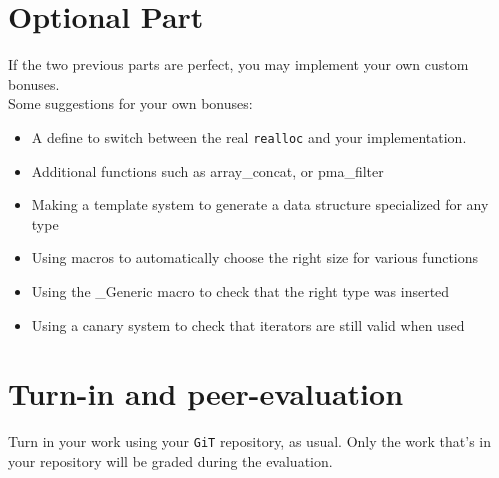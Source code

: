 \documentclass{42-en}
\begin{document}




\chapter{Optional Part}

    If the two previous parts are perfect, you may implement your own custom
    bonuses.\\

    Some suggestions for your own bonuses:
    \begin{itemize}\itemsep7pt
        \item A define to switch between the real \texttt{realloc} and your implementation.
        \item Additional functions such as array\_concat, or pma\_filter
        \item Making a template system to generate a data structure specialized for any type
        \item Using macros to automatically choose the right size for various functions
        \item Using the \_Generic macro to check that the right type was inserted
        \item Using a canary system to check that iterators are still valid when used
    \end{itemize}

\chapter{Turn-in and peer-evaluation}

    Turn in your work using your \texttt{GiT} repository, as
    usual. Only the work that's in your repository will be graded during
    the evaluation.



\end{document}
